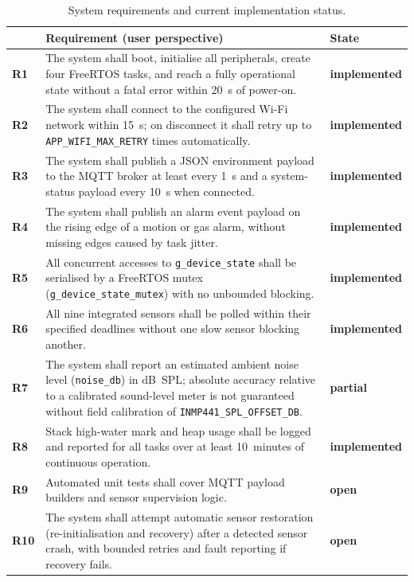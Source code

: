 \documentclass[11pt,a4paper]{article}
\newcommand{\rowhdr}{\rowcolor{tablehdr}}
\newcommand{\stateImpl}{\cellcolor{stategreen}\textcolor{stategreentext}{\textbf{implemented}}}
\newcommand{\statePartial}{\cellcolor{stateyellow}\textcolor{stateyellowtext}{\textbf{partial}}}
\newcommand{\stateOpen}{\cellcolor{statered}\textcolor{stateredtext}{\textbf{open}}}
\begin{document}
{\footnotesize
\setlength{\tabcolsep}{4pt}
\renewcommand{\arraystretch}{1.1}

\setlength\LTleft{0pt}
\begin{longtable}{@{}>{\bfseries}p{0.9cm}p{11.6cm}p{3.0cm}@{}}
\caption{System requirements and current implementation status.\label{tab:requirements}}\\
\rowhdr
\multicolumn{1}{@{}l}{\textbf{ID}} & \textbf{Requirement (user perspective)} & \textbf{State} \\
\midrule
\endhead
R1 & The system shall boot, initialise all peripherals, create four FreeRTOS tasks, and reach a
     fully operational state without a fatal error within 20~s of power-on. & \stateImpl \\
R2 & The system shall connect to the configured Wi-Fi network within 15~s; on disconnect it shall
     retry up to \texttt{APP\_WIFI\_MAX\_RETRY} times automatically. & \stateImpl \\
R3 & The system shall publish a JSON environment payload to the MQTT broker at least every 1~s
     and a system-status payload every 10~s when connected. & \stateImpl \\
R4 & The system shall publish an alarm event payload on the rising edge of a motion or gas alarm,
     without missing edges caused by task jitter. & \stateImpl \\
R5 & All concurrent accesses to \texttt{g\_device\_state} shall be serialised by a FreeRTOS
     mutex (\texttt{g\_device\_state\_mutex}) with no unbounded blocking. & \stateImpl \\
R6 & All nine integrated sensors shall be polled within their specified deadlines without one
     slow sensor blocking another. & \stateImpl \\
R7 & The system shall report an estimated ambient noise level (\texttt{noise\_db}) in dB~SPL;
     absolute accuracy relative to a calibrated sound-level meter is not guaranteed without
     field calibration of \texttt{INMP441\_SPL\_OFFSET\_DB}. & \statePartial \\
R8 & Stack high-water mark and heap usage shall be logged and reported for all tasks over at
     least 10~minutes of continuous operation. & \stateImpl \\
R9 & Automated unit tests shall cover MQTT payload builders and sensor supervision logic. & \stateOpen \\
R10 & The system shall attempt automatic sensor restoration (re-initialisation and recovery) after
      a detected sensor crash, with bounded retries and fault reporting if recovery fails. & \stateOpen \\
\bottomrule
\end{longtable}
}
\end{document}
